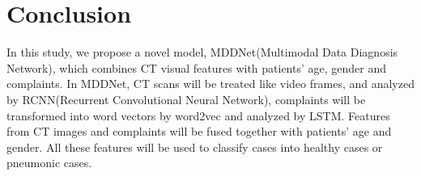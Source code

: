 \documentclass[journal]{IEEEtran}
\begin{document}
%






\section{Conclusion}
\label{conclude}
In this study, we propose a novel model, MDDNet(Multimodal Data Diagnosis Network), which combines CT visual features with patients' age, gender and complaints. In MDDNet, CT scans will be treated like video frames, and analyzed by RCNN(Recurrent Convolutional Neural Network), complaints will be transformed into word vectors by word2vec and analyzed by LSTM. Features from CT images and complaints will be fused together with patients' age and gender. All these features will be used to classify cases into healthy cases or pneumonic cases.
\end{document}
